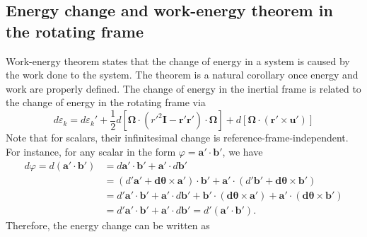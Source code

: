 \subsection{Energy change and work-energy theorem in the rotating frame}

Work-energy theorem states that the change of energy in a system is caused by the work done to the system. The theorem is a natural corollary once energy and work are properly defined.
The change of energy in the inertial frame is related to the change of energy in the rotating frame via
%
\[
    d\varepsilon_k = d\varepsilon_k' + \frac{1}{2} d\left[\boldsymbol{\Omega} \cdot \left(r'^2 \mathbf{I} - \mathbf{r}'\mathbf{r}'\right) \cdot \boldsymbol{\Omega}\right] + d\left[\boldsymbol{\Omega} \cdot (\mathbf{r}'\times \mathbf{u'})\right]
\]
%
Note that for scalars, their infinitesimal change is reference-frame-independent. For instance, for any scalar in the form $\varphi = \mathbf{a}'\cdot \mathbf{b}'$, we have
%
\[\begin{aligned}
    d \varphi = d (\mathbf{a}' \cdot \mathbf{b}') &= d\mathbf{a}'\cdot \mathbf{b}' + \mathbf{a}'\cdot d \mathbf{b}' \\
    &= \left(d'\mathbf{a}' + \mathbf{d}\boldsymbol{\theta}\times \mathbf{a}'\right)\cdot \mathbf{b}' + \mathbf{a}'\cdot \left(d'\mathbf{b}' + \mathbf{d}\boldsymbol{\theta}\times \mathbf{b}'\right) \\ 
    &= d' \mathbf{a}' \cdot \mathbf{b}' + \mathbf{a}' \cdot d \mathbf{b}' + \mathbf{b}'\cdot (\mathbf{d}\boldsymbol{\theta}\times \mathbf{a}') + \mathbf{a}'\cdot (\mathbf{d}\boldsymbol{\theta}\times \mathbf{b}') \\
    &= d' \mathbf{a}' \cdot \mathbf{b}' + \mathbf{a}' \cdot d \mathbf{b}' = d' (\mathbf{a}'\cdot \mathbf{b}').
\end{aligned}\]
%
Therefore, the energy change can be written as
%
